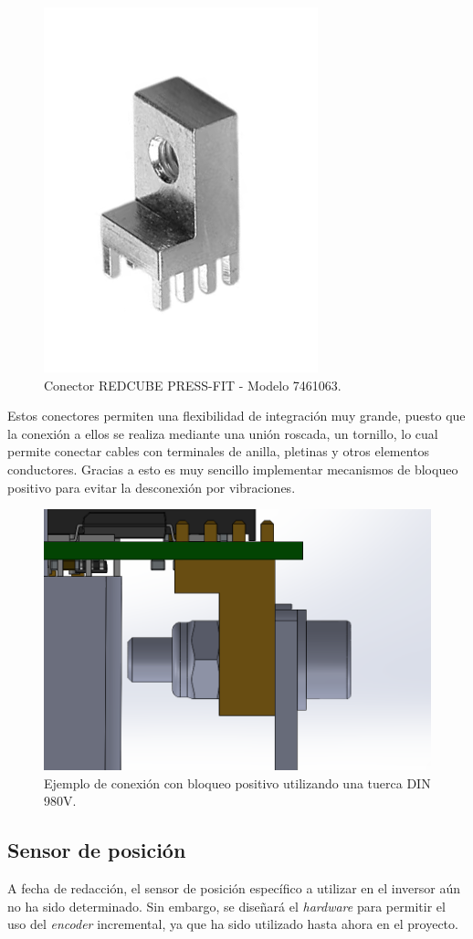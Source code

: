 \begin{figure}[H]
	\centering
	\includegraphics[width=0.35\linewidth]{fig/pressfit}
	\caption{Conector REDCUBE PRESS-FIT - Modelo 7461063.}
\end{figure}

Estos conectores permiten una flexibilidad de integración muy grande, puesto que la conexión a ellos se realiza mediante una unión roscada, un tornillo, lo cual permite conectar cables con terminales de anilla, pletinas y otros elementos conductores. Gracias a esto es muy sencillo implementar mecanismos de bloqueo positivo para evitar la desconexión por vibraciones.

\begin{figure}[H]
	\centering
	\includegraphics[width=0.5\linewidth]{fig/pressfit-980v}
	\caption{Ejemplo de conexión con bloqueo positivo utilizando una tuerca DIN 980V.}
\end{figure}



\subsection{Sensor de posición}

A fecha de redacción, el sensor de posición específico a utilizar en el inversor aún no ha sido determinado. Sin embargo, se diseñará el \textit{hardware} para permitir el uso del \textit{encoder} incremental, ya que ha sido utilizado hasta ahora en el proyecto.

